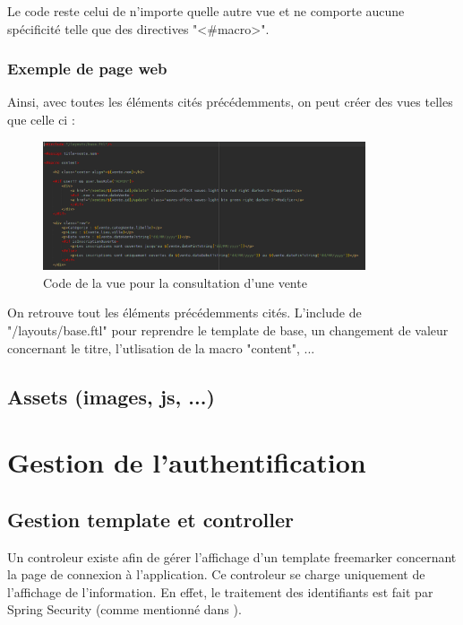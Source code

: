 				Le code reste celui de n'importe quelle autre vue et ne comporte aucune spécificité telle que des directives "<\#macro>".

			\subsubsection{Exemple de page web}

				Ainsi, avec toutes les éléments cités précédemments, on peut créer des vues telles que celle ci :

				\begin{figure}[H]
					\centering\includegraphics[width=0.85\textwidth, keepaspectratio]{res/view-venteConsulter.png}
					\caption{Code de la vue pour la consultation d'une vente}
				\end{figure}

				On retrouve tout les éléments précédemments cités. L'include de "/layouts/base.ftl" pour reprendre le template de base, un changement de valeur concernant le titre, l'utlisation de la macro "content", ...

		\subsection{Assets (images, js, ...)}


	\section{Gestion de l'authentification}

		\subsection{Gestion template et controller}

			Un controleur existe afin de gérer l'affichage d'un template freemarker concernant la page de connexion à l'application. Ce controleur se charge uniquement de l'affichage de l'information. En effet, le traitement des identifiants est fait par Spring Security (comme mentionné dans ).

